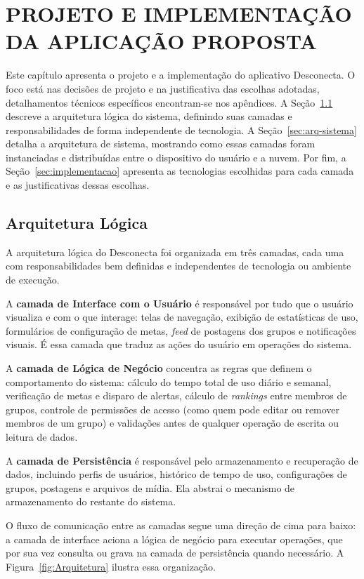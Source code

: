 \chapter{PROJETO E IMPLEMENTAÇÃO DA APLICAÇÃO PROPOSTA}

Este capítulo apresenta o projeto e a implementação do aplicativo Desconecta. O foco está nas decisões de projeto e na justificativa das escolhas adotadas, detalhamentos técnicos específicos encontram-se nos apêndices. A Seção~\ref{sec:arq-logica} descreve a arquitetura lógica do sistema, definindo suas camadas e responsabilidades de forma independente de tecnologia. A Seção~\ref{sec:arq-sistema} detalha a arquitetura de sistema, mostrando como essas camadas foram instanciadas e distribuídas entre o dispositivo do usuário e a nuvem. Por fim, a Seção~\ref{sec:implementacao} apresenta as tecnologias escolhidas para cada camada e as justificativas dessas escolhas.

\section{Arquitetura Lógica}
\label{sec:arq-logica}

A arquitetura lógica do Desconecta foi organizada em três camadas, cada uma com responsabilidades bem definidas e independentes de tecnologia ou ambiente de execução.

A \textbf{camada de Interface com o Usuário} é responsável por tudo que o usuário visualiza e com o que interage: telas de navegação, exibição de estatísticas de uso, formulários de configuração de metas, \textit{feed} de postagens dos grupos e notificações visuais. É essa camada que traduz as ações do usuário em operações do sistema.

A \textbf{camada de Lógica de Negócio} concentra as regras que definem o comportamento do sistema: cálculo do tempo total de uso diário e semanal, verificação de metas e disparo de alertas, cálculo de \textit{rankings} entre membros de grupos, controle de permissões de acesso (como quem pode editar ou remover membros de um grupo) e validações antes de qualquer operação de escrita ou leitura de dados.

A \textbf{camada de Persistência} é responsável pelo armazenamento e recuperação de dados, incluindo perfis de usuários, histórico de tempo de uso, configurações de grupos, postagens e arquivos de mídia. Ela abstrai o mecanismo de armazenamento do restante do sistema.

O fluxo de comunicação entre as camadas segue uma direção de cima para baixo: a camada de interface aciona a lógica de negócio para executar operações, que por sua vez consulta ou grava na camada de persistência quando necessário. A Figura~\ref{fig:Arquitetura} ilustra essa organização.

